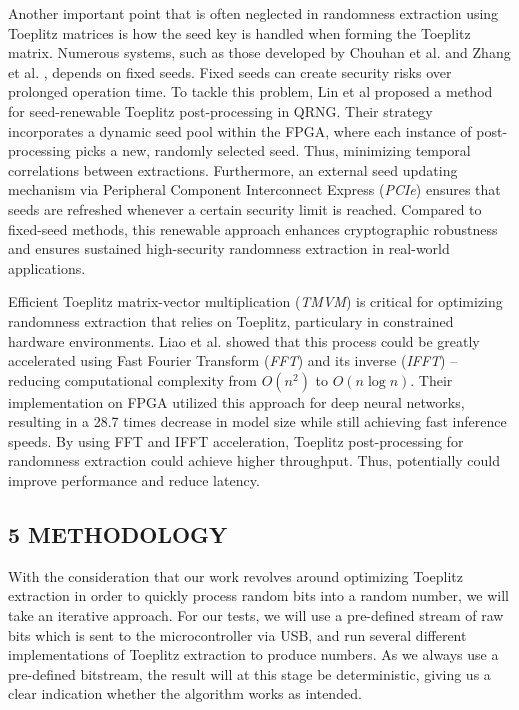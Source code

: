 \documentclass{sigchi}
\begin{document}
Another important point that is often neglected in randomness extraction using Toeplitz matrices is how the seed key is handled when forming the Toeplitz matrix. Numerous systems, such as those developed by Chouhan et al. \cite{toeplitz-desc} and Zhang et al. \cite{toeplitz}, depends on fixed seeds. Fixed seeds can create security risks over prolonged operation time. To tackle this problem, Lin et al \cite{lin} proposed a method for seed-renewable Toeplitz post-processing in QRNG. Their strategy incorporates a dynamic seed pool within the FPGA, where each instance of post-processing picks a new, randomly selected seed. Thus, minimizing temporal correlations between extractions. Furthermore, an external seed updating mechanism via Peripheral Component Interconnect Express (\emph{PCIe}) ensures that seeds are refreshed whenever a certain security limit is reached. Compared to fixed-seed methods, this renewable approach enhances cryptographic robustness and ensures sustained high-security randomness extraction in real-world applications.

Efficient Toeplitz matrix-vector multiplication (\emph{TMVM}) is critical for optimizing randomness extraction that relies on Toeplitz, particulary in constrained hardware environments. Liao et al. \cite{liao} showed that this process could be greatly accelerated using Fast Fourier Transform (\emph{FFT}) and its inverse (\emph{IFFT}) -- reducing computational complexity from \(O(n^2)\) to \(O(n \log n)\). Their implementation on FPGA utilized this approach for deep neural networks, resulting in a 28.7 times decrease in model size while still achieving fast inference speeds. By using FFT and IFFT acceleration, Toeplitz post-processing for randomness extraction could achieve higher throughput. Thus, potentially could improve performance and reduce latency.

\subsection{5 METHODOLOGY}\label{methodology}

With the consideration that our work revolves around optimizing Toeplitz extraction in order to quickly process random bits into a random number, we will take an iterative approach. For our tests, we will use a pre-defined stream of raw bits which is sent to the microcontroller via USB, and run several different implementations of Toeplitz extraction to produce numbers. As we always use a pre-defined bitstream, the result will at this stage be deterministic, giving us a clear indication whether the algorithm works as intended.
\end{document}
